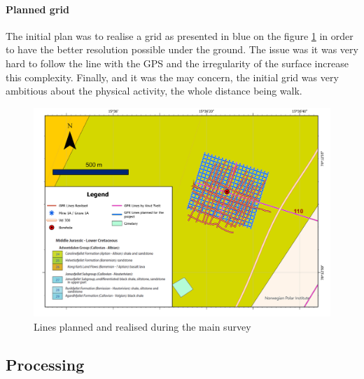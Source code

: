 \paragraph{Planned grid}

The initial plan was to realise a grid as presented in blue on the figure \ref{fig:GPRLines} in order to have the better resolution possible under the ground. The issue was it was very hard to follow the line with the GPS and the irregularity of the surface increase this complexity. Finally, and it was the may concern, the initial grid was very ambitious about the physical activity, the whole distance being walk. 

\begin{figure}[H]
    \centering
    \includegraphics[width=\linewidth]{Images/00_Methodology/GPR LIne.jpg}
    \caption{Lines planned and realised during the main survey}
    \label{fig:GPRLines}
\end{figure}

\subsection{Processing}